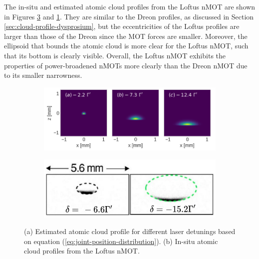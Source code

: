 The in-situ and estimated atomic cloud profiles from the Loftus nMOT are shown in Figures \ref{fig:Loftus-in-situ-atomic-cloud-profile} and \ref{fig:Loftus-simulated-atomic-cloud-profile}. They are similar to the Dreon profiles, as discussed in Section \ref{sec:cloud-profile-dysprosium}, but the eccentricities of the Loftus profiles are larger than those of the Dreon since the MOT forces are smaller. Moreover, the ellipsoid that bounds the atomic cloud is more clear for the Loftus nMOT, such that its bottom is clearly visible. Overall, the Loftus nMOT exhibits the properties of power-broadened nMOTs more clearly than the Dreon nMOT due to its smaller narrowness.
\begin{figure}[!ht]
    \centering
    \begin{subfigure}[b]{0.58\linewidth}
        \centering
        \includegraphics[width=\textwidth]{USPSC-img/sr_loftus_cloud_profile.png}
        \label{fig:Loftus-simulated-atomic-cloud-profile}
    \end{subfigure}
    \hfill
    \begin{subfigure}[b]{0.38\linewidth}
        \centering
        \includegraphics[width=\textwidth]{USPSC-img/loftus-atomic-cloud-profile.png}
        \vspace{40px}
        \label{fig:Loftus-in-situ-atomic-cloud-profile}
    \end{subfigure}
    \caption{(a) Estimated atomic cloud profile for different laser detunings based on equation (\ref{eq:joint-position-distribution}). (b) In-situ atomic cloud profiles from the Loftus nMOT.}
\end{figure}

